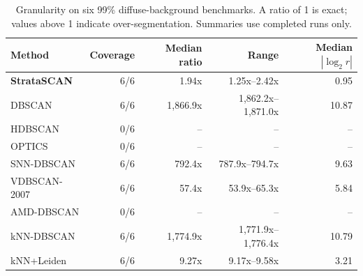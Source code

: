 \begin{table}[t]
\centering
\caption{Granularity on six 99\% diffuse-background benchmarks. A ratio of 1 is exact; values above 1 indicate over-segmentation. Summaries use completed runs only.}
\label{tab:noise99-granularity}
\scriptsize
\begin{tabular}{lrrrr}
\toprule
Method & Coverage & Median ratio & Range & Median $|\log_2 r|$ \\
\midrule
\textbf{StrataSCAN} & 6/6 & 1.94x & 1.25x--2.42x & 0.95 \\
DBSCAN & 6/6 & 1,866.9x & 1,862.2x--1,871.0x & 10.87 \\
HDBSCAN & 0/6 & -- & -- & -- \\
OPTICS & 0/6 & -- & -- & -- \\
SNN-DBSCAN & 6/6 & 792.4x & 787.9x--794.7x & 9.63 \\
VDBSCAN-2007 & 6/6 & 57.4x & 53.9x--65.3x & 5.84 \\
AMD-DBSCAN & 0/6 & -- & -- & -- \\
kNN-DBSCAN & 6/6 & 1,774.9x & 1,771.9x--1,776.4x & 10.79 \\
kNN+Leiden & 6/6 & 9.27x & 9.17x--9.58x & 3.21 \\
\bottomrule
\end{tabular}
\end{table}

